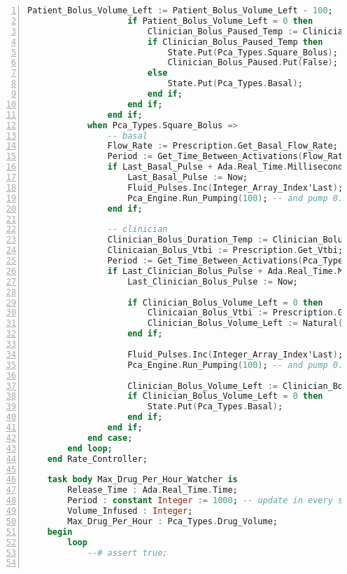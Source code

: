 \begin{lstlisting}[language=ada, gobble=0, numbers=left, caption={\lstinline{Pca_Operation} package}, label={listing:pca_ravenscar:pca_operation}]
                    Patient_Bolus_Volume_Left := Patient_Bolus_Volume_Left - 100;
                    if Patient_Bolus_Volume_Left = 0 then
                        Clinician_Bolus_Paused_Temp := Clinician_Bolus_Paused.Get;
                        if Clinician_Bolus_Paused_Temp then
                            State.Put(Pca_Types.Square_Bolus);
                            Clinician_Bolus_Paused.Put(False);
                        else
                            State.Put(Pca_Types.Basal);
                        end if;
                    end if;
                end if;
            when Pca_Types.Square_Bolus =>
                -- basal
                Flow_Rate := Prescription.Get_Basal_Flow_Rate;
                Period := Get_Time_Between_Activations(Flow_Rate);
                if Last_Basal_Pulse + Ada.Real_Time.Milliseconds(Period) <= Now then
                    Last_Basal_Pulse := Now;
                    Fluid_Pulses.Inc(Integer_Array_Index'Last); -- each time round, update the volume infused
                    Pca_Engine.Run_Pumping(100); -- and pump 0.1 ml
                end if;

                -- clinician
                Clinician_Bolus_Duration_Temp := Clinician_Bolus_Duration.Get;
                Clinicaian_Bolus_Vtbi := Prescription.Get_Vtbi;
                Period := Get_Time_Between_Activations(Pca_Types.Flow_Rate(Natural(Clinicaian_Bolus_Vtbi) * (60/Natural(Clinician_Bolus_Duration_Temp))));
                if Last_Clinician_Bolus_Pulse + Ada.Real_Time.Milliseconds(Period) <= Now then
                    Last_Clinician_Bolus_Pulse := Now;

                    if Clinician_Bolus_Volume_Left = 0 then
                        Clinicaian_Bolus_Vtbi := Prescription.Get_Vtbi;
                        Clinician_Bolus_Volume_Left := Natural(Clinicaian_Bolus_Vtbi) * 1000;  -- in microliters
                    end if;

                    Fluid_Pulses.Inc(Integer_Array_Index'Last); -- each time round, update the volume infused
                    Pca_Engine.Run_Pumping(100); -- and pump 0.1 ml

                    Clinician_Bolus_Volume_Left := Clinician_Bolus_Volume_Left - 100;
                    if Clinician_Bolus_Volume_Left = 0 then
                        State.Put(Pca_Types.Basal);
                    end if;
                end if;
            end case;
        end loop;
    end Rate_Controller;

    task body Max_Drug_Per_Hour_Watcher is
        Release_Time : Ada.Real_Time.Time;
        Period : constant Integer := 1000; -- update in every second
        Volume_Infused : Integer;
        Max_Drug_Per_Hour : Pca_Types.Drug_Volume;
    begin
        loop
            --# assert true;


\end{lstlisting}
